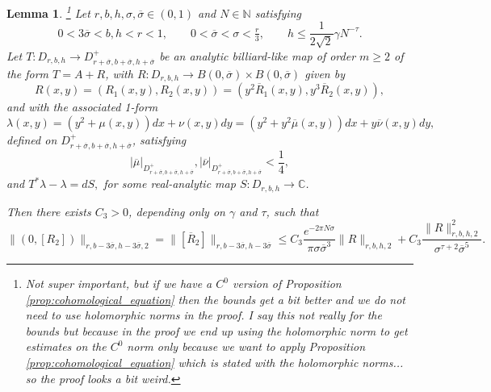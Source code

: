 \documentclass[10pt]{article}
\newtheorem{lemma}[theorem]{Lemma}
\newcommand{\Z}{\mathbb{Z}}
\newcommand{\N}{\mathbb{N}}
\newcommand{\C}{\mathbb{C}}
\newcommand{\Domain}[3]{D_{#1, #2, #3}}
\newcommand{\DomainP}[3]{D_{#1, #2, #3}^+}
\begin{document}
\begin{lemma}
\label{lem:average_scheme}\footnote{Not super important, but if we have a $C^0$ version of Proposition \ref{prop:cohomological_equation} then the bounds get a bit better and we do not need to use holomorphic norms in the proof. I say this not really for the bounds but because in the proof we end up using the holomorphic norm to get estimates on the $C^0$ norm only because we want to apply Proposition \ref{prop:cohomological_equation} which is stated with the holomorphic norms... so the proof looks a bit weird.}
  Let $r,b, h, \sigma, \overline \sigma\in(0,1)$ and $N \in \N$ satisfying
  \[0 < 3\overline \sigma <  b, h < r < 1, \qquad 0 < \overline \sigma < \sigma < \tfrac{r}{3}, \qquad h \leq \frac{1}{2\sqrt{2}}\gamma N^{-\tau}.\]
  Let $T: \Domain{r}{b}{h} \to \DomainP{r + \overline\sigma}{b + \overline\sigma}{h + \overline\sigma}$ %
  be an analytic billiard-like map of order $m \geq 2$ of the form $T = A + R$, with $R: \Domain{r}{b}{h} \to B(0, \overline\sigma) \times B(0, \overline\sigma)$ given by
    \[ R(x, y) =  (R_1(x, y), R_2(x , y)) = (y^2 \overline R_1(x, y), y^3 \overline R_2(x, y)),\]
    and with the associated 1-form
    \[\lambda(x, y) = (y^2 + \mu(x, y))dx + \nu(x, y)dy = (y^2 + y^2\overline{\mu}(x, y))dx + y\overline \nu(x, y)dy,\] 
    defined on $\DomainP{r + \overline\sigma}{b + \overline\sigma}{h + \overline\sigma}$, satisfying
            \begin{equation}
    \label{eq:smallness_form}
      |\overline \mu|_{\DomainP{r + \overline\sigma}{b + \overline\sigma}{h + \overline\sigma}}, |\overline \nu|_{\DomainP{r + \overline\sigma}{b + \overline\sigma}{h + \overline\sigma}} < \frac{1}{4},
    \end{equation}
    and $T^*\lambda - \lambda = dS,$ for some real-analytic map $S: \Domain{r}{b}{h} \to \C$.


    Then there exists $C_3 > 0$, depending only on $\gamma$ and $\tau$, such that
    \[ \| (0, [R_2])\|_{r, b - 3\overline\sigma, h - 3\overline\sigma, 2} =  \| [\overline{R}_2] \|_{r, b - 3\overline\sigma, h - 3\overline\sigma} \leq C_3\frac{e^{-2\pi N \sigma}}{\pi \sigma \overline \sigma^3}\| R \|_{r,b,h,2} + C_3\frac{\| R \|_{r,b,h,2}^2}{\sigma^{\tau + 2} \overline \sigma^5}.\]

\end{lemma}
\end{document}
